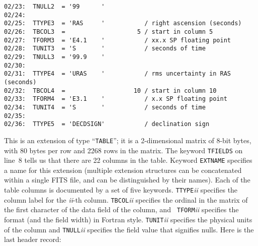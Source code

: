 {\begin{verbatim}
02/23:  TNULL2  = '99      '                                                            
02/24:                                                                                  
02/25:  TTYPE3  = 'RAS     '           / right ascension (seconds)                      
02/26:  TBCOL3  =                    5 / start in column 5                              
02/27:  TFORM3  = 'E4.1    '           / xx.x SP floating point                         
02/28:  TUNIT3  = 'S       '           / seconds of time                                
02/29:  TNULL3  = '99.9    '                                                            
02/30:                                                                                  
02/31:  TTYPE4  = 'URAS    '           / rms uncertainty in RAS (seconds)               
02/32:  TBCOL4  =                   10 / start in column 10                             
02/33:  TFORM4  = 'E3.1    '           / x.x SP floating point                          
02/34:  TUNIT4  = 'S       '           / seconds of time                                
02/35:                                                                                  
02/36:  TTYPE5  = 'DECDSIGN'           / declination sign                               
\end{verbatim} }

This is an extension of type ``{\tt TABLE}''; it is a 2-dimensional
matrix of 8-bit bytes, with 80 bytes per row and 2268 rows in the
matrix.  The keyword {\tt TFIELDS} on line~8 tells us that there are
22 columns in the table. Keyword {\tt EXTNAME} specifies a name for
this extension (multiple extension structures can be concatenated
within a single FITS file, and can be distinguished by their names).
Each of the table columns is documented by a set of five keywords.
{\tt TTYPE}{\em ii} specifies the column label for the {\em ii}-th
column.  {\tt TBCOL}{\em ii} specifies the ordinal in the matrix of
the first character of the data field of the column, and {\tt
TFORM}{\em ii} specifies the format (and the field width) in Fortran
style. {\tt TUNIT}{\em ii} specifies the physical units of the column
and {\tt TNULL}{\em ii} specifies the field value that signifies
nulls. Here is the last header record:

